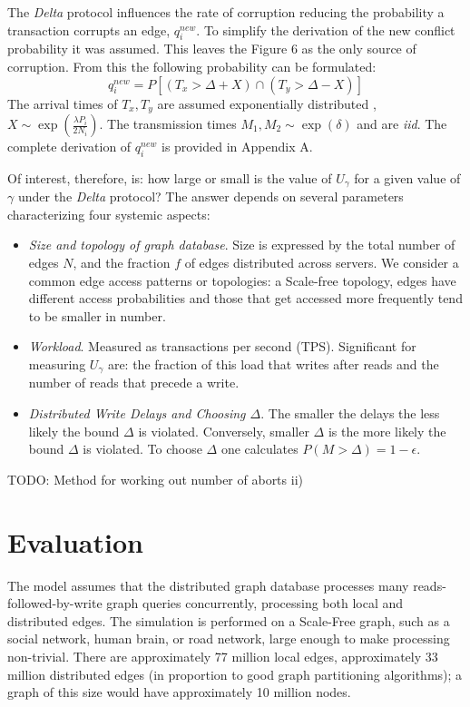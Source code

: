 \documentclass[sigplan,10pt]{acmart}
\begin{document}
The \emph{Delta} protocol influences the rate of corruption reducing the probability a transaction corrupts an edge, $q^{new}_i$. To simplify the derivation of the new conflict probability it was assumed. This leaves the Figure 6 as the only source of corruption. From this the following probability can be formulated:
$$ q^{new}_i = P \left[ ( T_x >  \Delta + X) \cap (T_y > \Delta-X) \right]$$
The arrival times of $T_x,T_y$ are assumed exponentially distributed , $X \sim \exp (\frac{\lambda P_i}{2N_i})$. The transmission times $M_1, M_2 \sim \exp (\delta)$ and are \emph{iid}. The complete derivation of $q^{new}_i$ is provided in Appendix A.

Of interest, therefore, is: how large or small is the value of $U_\gamma$ for a given value of $\gamma$ under the \emph{Delta} protocol? The answer depends on several parameters characterizing four systemic aspects:
\begin{itemize}
\item \emph{Size and topology of graph database}. Size is expressed by the total number of edges $N$, and the fraction $f$ of edges distributed across servers. We consider a common edge access patterns or topologies: a Scale-free topology, edges have different access probabilities and those that get accessed more frequently tend to be smaller in number.
\item \emph{Workload}. Measured as transactions per second (TPS). Significant for measuring $U_{\gamma}$ are: the fraction of this load that writes after reads and the number of reads that precede a write.
\item \emph{Distributed Write Delays and Choosing $\Delta$}. The smaller the delays the less likely the bound $\Delta$ is violated. Conversely, smaller $\Delta$ is the more likely the bound $\Delta$ is violated. To choose $\Delta$ one calculates $P(M>\Delta) = 1 - \epsilon$.
\end{itemize}

TODO: Method for working out number of aborts ii)


\section{Evaluation}
\label{sec:evaluation}

The model assumes that the distributed graph database  processes many reads-followed-by-write graph queries concurrently, processing both local and distributed edges. The simulation is performed on a Scale-Free graph, such as a social network, human brain, or road network, large enough to make processing non-trivial. There are approximately 77 million local edges, approximately 33 million distributed edges (in proportion to good graph partitioning algorithms); a graph of this size would have approximately 10 million nodes.
\end{document}

